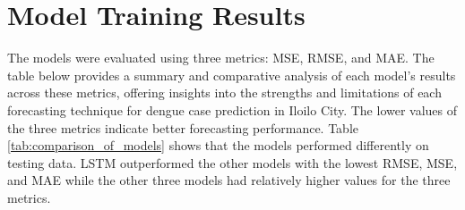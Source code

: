 	
\section{Model Training Results}

The models were evaluated using three metrics: MSE, RMSE, and MAE. The table below provides a summary and comparative analysis of each model’s results across these metrics, offering insights into the strengths and limitations of each forecasting technique for dengue case prediction in Iloilo City. The lower values of the three metrics indicate better forecasting performance. Table \ref{tab:comparison_of_models} shows that the models performed differently on testing data. LSTM outperformed the other models with the lowest RMSE, MSE, and MAE while the other three models had relatively higher values for the three metrics.

\begin{table}[h!]
	\centering
	\caption{Comparison of different models for dengue prediction}
	\label{tab:comparison_of_models}
\end{table}




